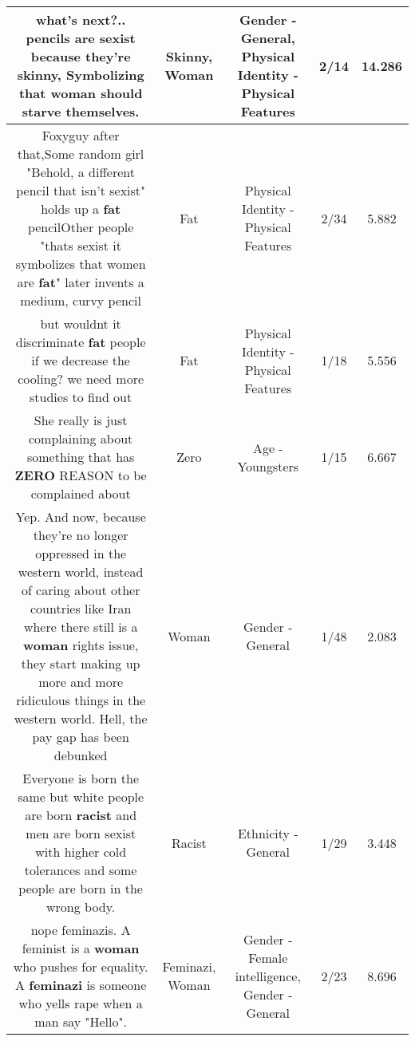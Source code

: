 \documentclass[11pt]{article}
\newlength\mylength
\begin{document}
\begin{center}
\begin{longtable}{|C{.65\mylength}|C{.30\mylength}|C{.12\mylength}|C{.12\mylength}|C{.12\mylength}|}
  \small what's next?.. pencils are sexist because they're \textbf{skinny},  Symbolizing that \textbf{woman} should starve themselves.\normalsize   & Skinny, Woman & Gender - General, Physical Identity - Physical Features & 2/14 & 14.286 \\  \hline
  \small Foxyguy after that,Some random girl "Behold, a different pencil that isn't sexist" holds up a \textbf{fat} pencilOther people "thats sexist it symbolizes that women are \textbf{fat}" later invents a medium, curvy pencil\normalsize   & Fat & Physical Identity - Physical Features & 2/34 & 5.882 \\  \hline
  \small but wouldnt it discriminate \textbf{fat} people if we decrease the cooling? we need more studies to find out\normalsize   & Fat & Physical Identity - Physical Features & 1/18 & 5.556 \\  \hline
  \small She really is just complaining about something that has \textbf{ZERO} REASON to be complained about\normalsize   & Zero & Age - Youngsters & 1/15 & 6.667 \\  \hline
  \small Yep. And now, because they're no longer oppressed in the western world, instead of caring about other countries like Iran where there still is a \textbf{woman} rights issue, they start making up more and more ridiculous things in the western world. Hell, the pay gap has been debunked\normalsize   & Woman & Gender - General & 1/48 & 2.083 \\  \hline
  \small Everyone is born the same but white people are born \textbf{racist} and men are born sexist with higher cold tolerances and some people are born in the wrong body.\normalsize   & Racist & Ethnicity - General & 1/29 & 3.448 \\  \hline
  \small nope feminazis. A feminist is a \textbf{woman} who pushes for equality. A \textbf{feminazi} is someone who yells rape when a man say "Hello".\normalsize   & Feminazi, Woman & Gender - Female intelligence, Gender - General & 2/23 & 8.696 \\  \hline

\end{longtable}
\end{center}
\end{document}
